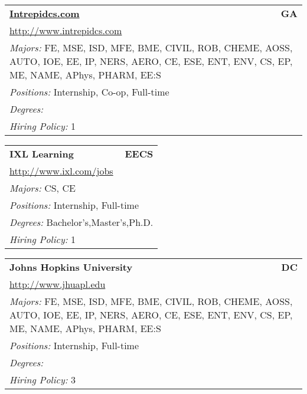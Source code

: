 \documentclass[twoside]{article}
\begin{document}
\begin{center}
\begin{multicols}{3}
\begin{FlushLeft}
\begin{minipage}{.9\columnwidth}\begin{tabularx}{.95\columnwidth}{Xr}
                 {\Large\bf \url{Intrepidcs.com}} & {\Large\bf GA}\\
    \multicolumn{2}{p{.95\columnwidth}}{\url{http://www.intrepidcs.com}}\\
    \multicolumn{2}{p{.95\columnwidth}}{\emph{Majors:} FE, MSE, ISD, MFE, BME, CIVIL, ROB, CHEME, AOSS, AUTO, IOE, EE, IP, NERS, AERO, CE, ESE, ENT, ENV, CS, EP, ME, NAME, APhys, PHARM, EE:S}\\
    \multicolumn{2}{p{.95\columnwidth}}{\emph{Positions:} Internship, Co-op, Full-time}\\
    \multicolumn{2}{p{.95\columnwidth}}{\emph{Degrees:} }\\
    \multicolumn{2}{p{.95\columnwidth}}{\emph{Hiring Policy:} 1}\\
    \end{tabularx}
    
\end{minipage}
 
\begin{minipage}{.9\columnwidth}\begin{tabularx}{.95\columnwidth}{Xr}
                 {\Large\bf IXL Learning} & {\Large\bf EECS}\\
    \multicolumn{2}{p{.95\columnwidth}}{\url{http://www.ixl.com/jobs}}\\
    \multicolumn{2}{p{.95\columnwidth}}{\emph{Majors:} CS, CE}\\
    \multicolumn{2}{p{.95\columnwidth}}{\emph{Positions:} Internship, Full-time}\\
    \multicolumn{2}{p{.95\columnwidth}}{\emph{Degrees:} Bachelor's,Master's,Ph.D.}\\
    \multicolumn{2}{p{.95\columnwidth}}{\emph{Hiring Policy:} 1}\\
    \end{tabularx}
    
\end{minipage}
 
\begin{minipage}{.9\columnwidth}\begin{tabularx}{.95\columnwidth}{Xr}
                 {\Large\bf Johns Hopkins University} & {\Large\bf DC}\\
    \multicolumn{2}{p{.95\columnwidth}}{\url{http://www.jhuapl.edu}}\\
    \multicolumn{2}{p{.95\columnwidth}}{\emph{Majors:} FE, MSE, ISD, MFE, BME, CIVIL, ROB, CHEME, AOSS, AUTO, IOE, EE, IP, NERS, AERO, CE, ESE, ENT, ENV, CS, EP, ME, NAME, APhys, PHARM, EE:S}\\
    \multicolumn{2}{p{.95\columnwidth}}{\emph{Positions:} Internship, Full-time}\\
    \multicolumn{2}{p{.95\columnwidth}}{\emph{Degrees:} }\\
    \multicolumn{2}{p{.95\columnwidth}}{\emph{Hiring Policy:} 3}\\
    \end{tabularx}
    

\end{minipage}
\end{FlushLeft}
\end{multicols}
\end{center}
\end{document}
